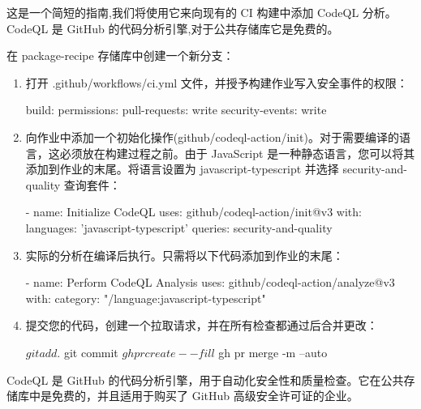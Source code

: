 这是一个简短的指南,我们将使用它来向现有的 CI 构建中添加 CodeQL 分析。CodeQL 是 GitHub 的代码分析引擎,对于公共存储库它是免费的。


在 package-recipe 存储库中创建一个新分支：



\begin{enumerate}
\item 
打开 .github/workflows/ci.yml 文件，并授予构建作业写入安全事件的权限：

\begin{shell}
build:
  permissions:
    pull-requests: write
    security-events: write
\end{shell}

\item 
向作业中添加一个初始化操作(github/codeql-action/init)。对于需要编译的语言，这必须放在构建过程之前。由于 JavaScript 是一种静态语言，您可以将其添加到作业的末尾。将语言设置为 javascript-typescript 并选择 security-and-quality 查询套件：

\begin{shell}
    - name: Initialize CodeQL
      uses: github/codeql-action/init@v3
      with:
        languages: 'javascript-typescript'
        queries: security-and-quality
\end{shell}

\item 
实际的分析在编译后执行。只需将以下代码添加到作业的末尾：

\begin{shell}
    - name: Perform CodeQL Analysis
      uses: github/codeql-action/analyze@v3
      with:
        category: "/language:javascript-typescript"
\end{shell}

\item 
提交您的代码，创建一个拉取请求，并在所有检查都通过后合并更改：

\begin{shell}
$ git add .
$ git commit
$ gh pr create --fill
$ gh pr merge -m --auto
\end{shell}
\end{enumerate}


CodeQL 是 GitHub 的代码分析引擎，用于自动化安全性和质量检查。它在公共存储库中是免费的，并且适用于购买了 GitHub 高级安全许可证的企业。

